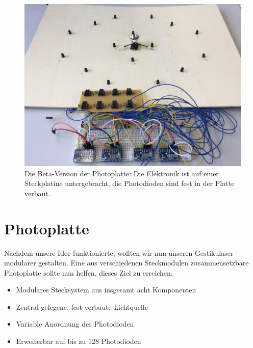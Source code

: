 ﻿\documentclass{sciposter}
\begin{document}
\begin{multicols}{3}
\begin{figure}[h]
	\centering
	\includegraphics[scale=0.175]{../figures/PhotoplatteBeta.jpeg}
	\caption{Die Beta-Version der Photoplatte: Die Elektronik ist auf einer Steckplatine untergebracht, die Photodioden sind fest in der Platte verbaut.}
	\label{fig:PhotoplatteBeta}
\end{figure}


\section{Photoplatte}
\noindent
Nachdem unsere Idee funktionierte, wollten wir nun unseren Gestikulaser modularer gestalten. Eine aus verschiedenen Steckmodulen zusammensetzbare Photoplatte sollte nun helfen, dieses Ziel zu erreichen.

\begin{itemize}
	\item Modulares Stecksystem aus insgesamt acht Komponenten
	\item Zentral gelegene, fest verbaute Lichtquelle
	\item Variable Anordnung der Photodioden
	\item Erweiterbar auf bis zu 128 Photodioden
\end{itemize}


\end{multicols}
\end{document}
